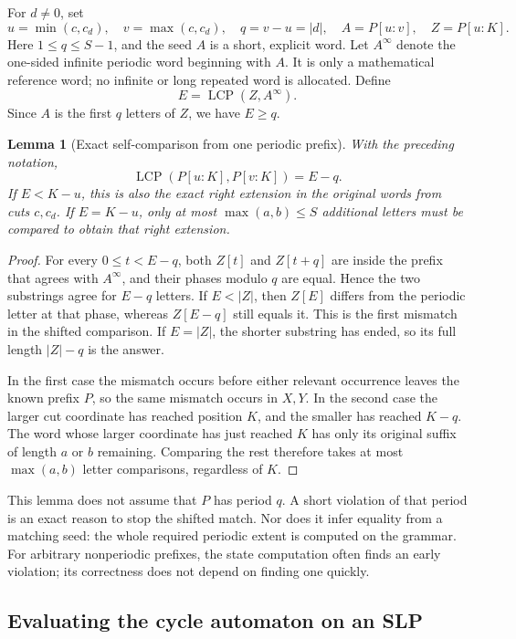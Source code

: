 \documentclass[11pt]{article}
\newtheorem{lemma}[theorem]{Lemma}
\theoremstyle{definition}
\theoremstyle{remark}
\newcommand{\LCP}{\operatorname{LCP}}
\begin{document}
For $d\ne0$, set
\[
 u=\min(c,c_d),\quad v=\max(c,c_d),\quad q=v-u=|d|,
 \quad A=P[u:v],\quad Z=P[u:K].
\]
Here $1\le q\le S-1$, and the seed $A$ is a short, explicit word. Let
$A^\infty$ denote the one-sided infinite periodic word beginning with $A$.
It is only a mathematical reference word; no infinite or long repeated
word is allocated. Define
\[
 E=\LCP(Z,A^\infty).
\]
Since $A$ is the first $q$ letters of $Z$, we have $E\ge q$.

\begin{lemma}[Exact self-comparison from one periodic prefix]
\label{lem:near-prefix-periodicity}
With the preceding notation,
\[
 \LCP(P[u:K],P[v:K])=E-q.
\]
If $E<K-u$, this is also the exact right extension in the original words
from cuts $c,c_d$. If $E=K-u$, only at most $\max(a,b)\le S$ additional
letters must be compared to obtain that right extension.
\end{lemma}

\begin{proof}
For every $0\le t<E-q$, both $Z[t]$ and $Z[t+q]$ are inside the prefix
that agrees with $A^\infty$, and their phases modulo $q$ are equal.
Hence the two substrings agree for $E-q$ letters. If $E<|Z|$, then
$Z[E]$ differs from the periodic letter at that phase, whereas
$Z[E-q]$ still equals it. This is the first mismatch in the shifted
comparison. If $E=|Z|$, the shorter substring has ended, so its full
length $|Z|-q$ is the answer.

In the first case the mismatch occurs before either relevant occurrence
leaves the known prefix $P$, so the same mismatch occurs in $X,Y$. In
the second case the larger cut coordinate has reached position $K$,
and the smaller has reached $K-q$. The word whose larger coordinate
has just reached $K$ has only its original suffix of length $a$ or $b$
remaining. Comparing the rest therefore takes at most $\max(a,b)$
letter comparisons, regardless of $K$.
\end{proof}

This lemma does not assume that $P$ has period $q$. A short violation
of that period is an exact reason to stop the shifted match. Nor does
it infer equality from a matching seed: the whole required periodic
extent is computed on the grammar. For arbitrary nonperiodic prefixes,
the state computation often finds an early violation; its correctness
does not depend on finding one quickly.

\subsection{Evaluating the cycle automaton on an SLP}
\end{document}

